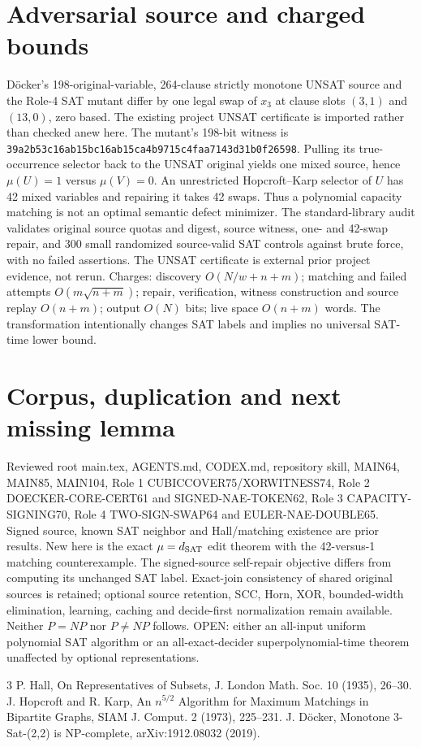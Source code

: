 \documentclass[11pt]{article}
\begin{document}
\section{Adversarial source and charged bounds}
D\"ocker's 198-original-variable, 264-clause strictly monotone UNSAT source and the Role-4 SAT mutant differ by one legal swap of $x_3$ at clause slots $(3,1)$ and $(13,0)$, zero based. The existing project UNSAT certificate is imported rather than checked anew here. The mutant's 198-bit witness is \texttt{39a2b53c16ab15bc16ab15ca4b9715c4faa7143d31b0f26598}. Pulling its true-occurrence selector back to the UNSAT original yields one mixed source, hence $\mu(U)=1$ versus $\mu(V)=0$. An unrestricted Hopcroft--Karp selector of $U$ has 42 mixed variables and repairing it takes 42 swaps. Thus a polynomial capacity matching is not an optimal semantic defect minimizer.
The standard-library audit validates original source quotas and digest, source witness, one- and 42-swap repair, and 300 small randomized source-valid SAT controls against brute force, with no failed assertions. The UNSAT certificate is external prior project evidence, not rerun. Charges: discovery $O(N/w+n+m)$; matching and failed attempts $O(m\sqrt{n+m})$; repair, verification, witness construction and source replay $O(n+m)$; output $O(N)$ bits; live space $O(n+m)$ words. The transformation intentionally changes SAT labels and implies no universal SAT-time lower bound.
\section{Corpus, duplication and next missing lemma}
Reviewed root main.tex, AGENTS.md, CODEX.md, repository skill, MAIN64, MAIN85, MAIN104, Role 1 CUBICCOVER75/XORWITNESS74, Role 2 DOECKER-CORE-CERT61 and SIGNED-NAE-TOKEN62, Role 3 CAPACITY-SIGNING70, Role 4 TWO-SIGN-SWAP64 and EULER-NAE-DOUBLE65. Signed source, known SAT neighbor and Hall/matching existence are prior results. New here is the exact $\mu=d_{\rm SAT}$ edit theorem with the 42-versus-1 matching counterexample. The signed-source self-repair objective differs from computing its unchanged SAT label. Exact-join consistency of shared original sources is retained; optional source retention, SCC, Horn, XOR, bounded-width elimination, learning, caching and decide-first normalization remain available. Neither $P=NP$ nor $P\ne NP$ follows. OPEN: either an all-input uniform polynomial SAT algorithm or an all-exact-decider superpolynomial-time theorem unaffected by optional representations.
\begin{thebibliography}{3}
 P. Hall, On Representatives of Subsets, J. London Math. Soc. 10 (1935), 26--30.
 J. Hopcroft and R. Karp, An $n^{5/2}$ Algorithm for Maximum Matchings in Bipartite Graphs, SIAM J. Comput. 2 (1973), 225--231.
 J. D\"ocker, Monotone 3-Sat-(2,2) is NP-complete, arXiv:1912.08032 (2019).
\end{thebibliography}
\end{document}
